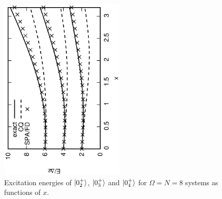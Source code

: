 \documentclass[%
superscriptaddress,
preprint,
showpacs,
nofootinbib,
amsmath,amssymb,
aps,
prc,
floatfix ]%
{revtex4-1}
\begin{document}
\begin{figure}[t]
 \begin{center}
  \includegraphics[width=60mm,angle=-90]{N8ex_energy_wo_adiabatic.eps}
 \end{center}
 \caption{Excitation energies of $\ket{0_2^+}$, $\ket{0_3^+}$ and
$\ket{0_4^+}$ for $\Omega=N=8$ systems as functions of $x$.
}
 \label{fig:N8energy}
\end{figure}
\end{document}
